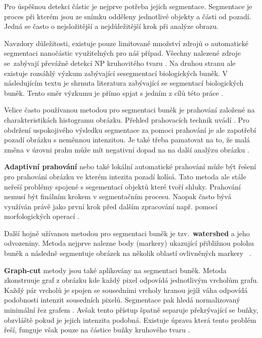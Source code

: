 \documentclass[11pt,twoside,a4paper,table]{book}
\begin{document}
Pro úspěšnou detekci částic je nejprve potřeba jejich segmentace. Segmentace je proces při kterém jsou ze snímku odděleny jednotlivé objekty a části od pozadí. Jedná se často o nejsložitější a nejdůležitější krok při analýze obrazu.

Navzdory důležitosti, existuje pouze limitované množství zdrojů o automatické segmentaci nanočástic využitelných pro náš případ. Všechny nalezené zdroje se~zabývají převážně detekcí NP kruhovitého tvaru \cite{art:mcfarland}\cite{art:glotov}\cite{art:chen}. Na druhou stranu ale existuje rozsáhlý výzkum zabývající sesegmentací biologických buněk. V následujícím textu je shrnuta literatura zabývající se segmentací biologických buněk. Tento směr výzkumu je přímo spjat s jedním z cílů této práce \cite{art:ultimate}.

Velice často používanou metodou pro segmentaci buněk je prahování založené na charakteristikách histogramu obrázku. Přehled prahovacích technik uvádí \cite{art:sahoo88}. Pro obdržení uspokojivého výsledku segmentace za pomoci prahování je ale zapotřebí pozadí obrázku s neměnnou intenzitou. Je také třeba pamatovat na to, že malá změna v úrovni prahu může mít negativní dopad na na další analýzu obrázku \cite{art:wahlby}.

\textbf{Adaptivní prahování} nebo také lokální automatické prahování může být řešení pro prahování obrázku ve kterém intezita pozadí kolísá. Tato metoda ale stále neřeší problémy spojené s segementací objektů které tvoří shluky. Prahování nemusí být finálním krokem v segmentačním procesu. Naopak často bývá využíván právě jako první krok před dalším zpracování např. pomocí morfologických operací \cite{book:imgproc_gonzalez} \cite{art:wahlby}.

Další hojně užívanou metodou pro segmentaci buněk je tzv.~\textbf{watershed} a jeho odvozeniny. Metoda nejprve nalezne body (markery) ukazující přibližnou polohu buněk a následně segmentuje obrázek na několik oblastí ovlivněných markery~\cite{art:watershed1} \cite{art:watershed2}\cite{art:watershed3}\cite{art:wahlby}.

\textbf{Graph-cut} metody jsou také aplikovány na segmentaci buněk. Metoda zkonstruuje graf z obrázku kde každý pixel odpovídá jednotlivým vrcholům grafu. Každý pár vrcholů je spojen se sousedními vrcholy hranou jejíž váha odpovídá podobnosti intenzit sousedních pixelů. Segmentace pak hledá normalizovaný minimální řez grafem \cite{art:grabcut1}. Avšak tento přístup špatně separuje překrývající se buňky, obzvláště pokud je jejich intenzita podobná. Existuje úprava která tento problém řeší, funguje však pouze na částice buňky kruhového tvaru \cite{art:ultimate}.
\end{document}
